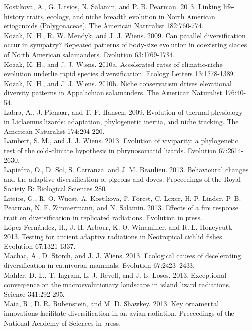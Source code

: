 Kostikova, A., G. Litsios, N. Salamin, and P. B. Pearman. 2013. Linking life-history traits, ecology, and niche breadth evolution in North American eriogonoids (Polygonaceae). The American Naturalist 182:760-774.\\
Kozak, K. H., R. W. Mendyk, and J. J. Wiens. 2009. Can parallel diversification occur in sympatry? Repeated patterns of body-size evolution in coexisting clades of North American salamanders. Evolution 63:1769-1784.\\
Kozak, K. H., and J. J. Wiens. 2010a. Accelerated rates of climatic-niche evolution underlie rapid species diversification. Ecology Letters 13:1378-1389.\\
Kozak, K. H., and J. J. Wiens. 2010b. Niche conservatism drives elevational diversity patterns in Appalachian salamanders. The American Naturalist 176:40-54.\\
Labra, A., J. Pienaar, and T. F. Hansen. 2009. Evolution of thermal physiology in Liolaemus lizards: adaptation, phylogenetic inertia, and niche tracking. The American Naturalist 174:204-220.\\
Lambert, S. M., and J. J. Wiens. 2013. Evolution of viviparity: a phylogenetic test of the cold-climate hypothesis in phrynosomatid lizards. Evolution 67:2614-2630.\\
Lapiedra, O., D. Sol, S. Carranza, and J. M. Beaulieu. 2013. Behavioural changes and the adaptive diversification of pigeons and doves. Proceedings of the Royal Society B: Biological Sciences 280.\\
Litsios, G., R. O. Wüest, A. Kostikova, F. Forest, C. Lexer, H. P. Linder, P. B. Pearman, N. E. Zimmermann, and N. Salamin. 2013. Effects of a fire response trait on diversification in replicated radiations. Evolution in press.\\
López-Fernández, H., J. H. Arbour, K. O. Winemiller, and R. L. Honeycutt. 2013. Testing for ancient adaptive radiations in Neotropical cichlid fishes. Evolution 67:1321-1337.\\
Machac, A., D. Storch, and J. J. Wiens. 2013. Ecological causes of decelerating diversification in carnivoran mammals. Evolution 67:2423–2433.\\
Mahler, D. L., T. Ingram, L. J. Revell, and J. B. Losos. 2013. Exceptional convergence on the macroevolutionary landscape in island lizard radiations. Science 341:292-295.\\
Maia, R., D. R. Rubenstein, and M. D. Shawkey. 2013. Key ornamental innovations facilitate diversification in an avian radiation. Proceedings of the National Academy of Sciences in press.\\
